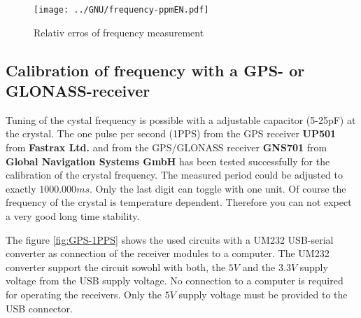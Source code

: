 \begin{figure}[H]
\centering
\texttt{[image: ../GNU/frequency-ppmEN.pdf]}
\caption{Relativ erros of frequency measurement}
\label{fig:freq-ppm}
\end{figure}

\subsection{Calibration of frequency with a GPS- or GLONASS-receiver}

Tuning of the cystal frequency is possible with a adjustable capacitor (5-25pF) at the crystal.
The one pulse per second (1PPS) from the GPS receiver \textbf {UP501} from \textbf {Fastrax Ltd.} and from the GPS/GLONASS receiver
\textbf {GNS701} from \textbf {Global Navigation Systems GmbH} has been tested successfully for the calibration of the
crystal frequency.
The measured period could be adjusted to exactly \(1000.000ms\).
Only the last digit can toggle with one unit.
Of course the frequency of the crystal is temperature dependent.
Therefore you can not expect a very good long time stability.

The figure \ref{fig:GPS-1PPS} shows the used circuits with a UM232 USB-serial converter
as connection of the receiver modules to a computer.
The UM232 converter support the circuit sowohl with both, the \(5V\) and the \(3.3V\) supply voltage
from the USB supply voltage.
No connection to a computer is required for operating the receivers.
Only the \(5V\) supply voltage must be provided to the USB connector.

